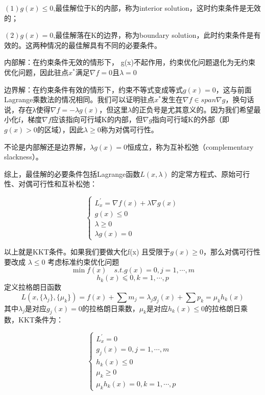 \documentclass[UTF8]{article}
\begin{document}
{$(1)g(x)\le 0$,最佳解位于K的内部，称为interior solution，这时约束条件是无效的；

$(2)g(x) = 0$,最佳解落在K的边界，称为boundary solution，此时约束条件是有效的。这两种情况的最佳解具有不同的必要条件。


内部解：在约束条件无效的情形下， g(x)不起作用，约束优化问题退化为无约束优化问题，因此驻点$x^*$满足$\nabla f = 0 $且$\lambda = 0$

边界解：在约束条件有效的情形下，约束不等式变成等式$g(x)=0$，这与前面Lagrange乘数法的情况相同。我们可以证明驻点$x^*$发生在$\nabla f\in span{\nabla g}$，换句话说，存在λ使得$\nabla f=−\lambda g(x)$，但这里$\lambda$的正负号是尤其意义的。因为我们希望最小化f，梯度$\nabla f$应该指向可行域K的内部，但$\nabla g$指向可行域K的外部（即$g(x)>0$的区域），因此$\lambda \ge 0$称为对偶可行性。

不论是内部解还是边界解，$\lambda g(x)=0$恒成立，称为互补松弛（complementary slackness）。

综上，最佳解的必要条件包括Lagrange函数$L(x,\lambda)$
的定常方程式、原始可行性、对偶可行性和互补松弛：

\begin{equation}
\left\{
\begin{array}{lcl}
L_x^{'} = \nabla f(x)+\lambda \nabla g(x) \\
g(x)\le0 \\
\lambda \ge0\\
\lambda g(x)=0
\end{array}
\right.
\end{equation}

以上就是KKT条件。如果我们要做大化f(x)
且受限于$g(x) \ge 0$，那么对偶可行性要改成 $\lambda \le 0$
考虑标准约束优化问题
$$\min f(x)\quad s.t.g(x)=0, j=1,\cdots,m$$ 
$$h_k(x)⩽0, k=1,\cdots,p$$
定义拉格朗日函数
$$L(x,\{\lambda_j\},\{\mu_k\})=f(x)+∑m_j=\lambda_jg_j(x)+∑p_k=\mu_kh_k(x)$$
其中$\lambda_j$是对应$g_j(x)=0$的拉格朗日乘数，$\mu_k$是对应$h_k(x)\le0$的拉格朗日乘数，KKT条件为：

\begin{equation}
	\left\{
	\begin{array}{lcl}
	L_x^{'} = 0\\
	g_j(x)=0,j=1,\cdots,m \\
	h_k(x)\le0\\
	\mu_k\ge0 \\
	\mu_kh_k(x)=0,k=1,\cdots,p
	\end{array}
	\right.
\end{equation}



}
\end{document}
